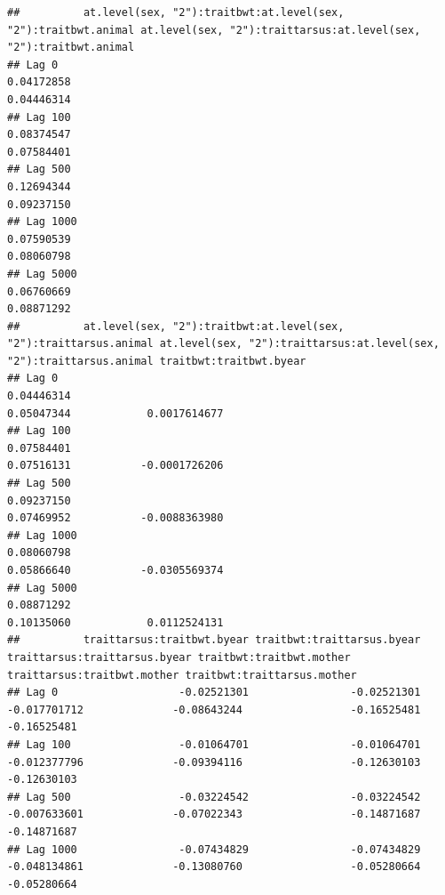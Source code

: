 \documentclass[
  12pt,
]{book}
\begin{document}
\begin{verbatim}
##          at.level(sex, "2"):traitbwt:at.level(sex, "2"):traitbwt.animal at.level(sex, "2"):traittarsus:at.level(sex, "2"):traitbwt.animal
## Lag 0                                                        0.04172858                                                        0.04446314
## Lag 100                                                      0.08374547                                                        0.07584401
## Lag 500                                                      0.12694344                                                        0.09237150
## Lag 1000                                                     0.07590539                                                        0.08060798
## Lag 5000                                                     0.06760669                                                        0.08871292
##          at.level(sex, "2"):traitbwt:at.level(sex, "2"):traittarsus.animal at.level(sex, "2"):traittarsus:at.level(sex, "2"):traittarsus.animal traitbwt:traitbwt.byear
## Lag 0                                                           0.04446314                                                           0.05047344            0.0017614677
## Lag 100                                                         0.07584401                                                           0.07516131           -0.0001726206
## Lag 500                                                         0.09237150                                                           0.07469952           -0.0088363980
## Lag 1000                                                        0.08060798                                                           0.05866640           -0.0305569374
## Lag 5000                                                        0.08871292                                                           0.10135060            0.0112524131
##          traittarsus:traitbwt.byear traitbwt:traittarsus.byear traittarsus:traittarsus.byear traitbwt:traitbwt.mother traittarsus:traitbwt.mother traitbwt:traittarsus.mother
## Lag 0                   -0.02521301                -0.02521301                  -0.017701712              -0.08643244                 -0.16525481                 -0.16525481
## Lag 100                 -0.01064701                -0.01064701                  -0.012377796              -0.09394116                 -0.12630103                 -0.12630103
## Lag 500                 -0.03224542                -0.03224542                  -0.007633601              -0.07022343                 -0.14871687                 -0.14871687
## Lag 1000                -0.07434829                -0.07434829                  -0.048134861              -0.13080760                 -0.05280664                 -0.05280664

\end{verbatim}
\end{document}
